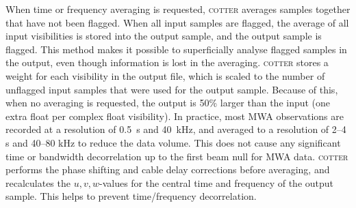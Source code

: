 \documentclass{pasa}
\begin{document}
When time or frequency averaging is requested, \textsc{cotter} averages samples together that have not been flagged. When all input samples are flagged, the average of all input visibilities is stored into the output sample, and the output sample is flagged. This method makes it possible to superficially analyse flagged samples in the output, even though information is lost in the averaging. \textsc{cotter} stores a weight for each visibility in the output file, which is scaled to the number of unflagged input samples that were used for the output sample. Because of this, when no averaging is requested, the output is 50\% larger than the input (one extra float per complex float visibility). In practice, most MWA observations are recorded at a resolution of 0.5~s and 40~kHz, and averaged to a resolution of 2--4 s and 40--80 kHz to reduce the data volume. This does not cause any significant time or bandwidth decorrelation up to the first beam null for MWA data. \textsc{cotter} performs the phase shifting and cable delay corrections before averaging, and recalculates the $u,v,w$-values for the central time and frequency of the output sample. This helps to prevent time/frequency decorrelation.
\end{document}
